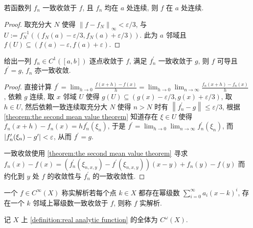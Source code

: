 \begin{lemma}
    若函数列 \(f_n\) 一致收敛于 \(f\), 且 \(f_n\) 均在 \(a\) 处连续, 则 \(f\) 在 \(a\) 处连续.

    \begin{proof}
        取充分大 \(N\) 使得 \(\left\|f - f_N\right\|_\infty < \varepsilon/3\), 与 \(U := f_N^{-1} ((f_N(a) - \varepsilon/3,f_N(a) + \varepsilon/3))\). 
        此为 \(a\) 邻域且 \(f(U) \subseteq (f(a) - \varepsilon, f(a) + \varepsilon)\).
    \end{proof}
\end{lemma}

\begin{lemma}
    给出一列 \(f_n \in C^1([a,b])\) 逐点收敛于 \(f\), 满足 \(f_n^\prime\) 一致收敛于 \(g\),
    则 \(f\) 可导且 \(f^\prime = g\), \(f_n\) 亦一致收敛.

    \begin{proof}
        直接计算 \(f^\prime = \lim_{h \to 0} \frac{f(x+h)-f(x)}{h} = \lim_{h \to 0} \lim_{n \to \infty} \frac{f_n(x+h) - f_n(x)}{h}\),
        依赖 \(g\) 连续, 取 \(x\) 邻域 \(U\) 使得 \(g(U) \subseteq (g(x)-\varepsilon/3,g(x)+\varepsilon/3)\), 取 \(h \in U\), 然后依赖一致连续取充分大 \(N\) 使得 \(n > N\) 时有 \(\left\|f_n^\prime - g\right\| \leq \varepsilon/3\),
        根据 \ref{theorem:the second mean value theorem} 知道存在 \(\xi \in U\) 使得 \(f_n (x+h) - f_n(x) = h f_n^\prime (\xi_n)\), 于是 \(f^\prime = \lim_{h \to 0} \lim_{n \to \infty} f_n^\prime (\xi_n)\),
        而 \(\abs {f^\prime_n (\xi_n) - g^\prime} < \varepsilon\), 从而 \(f^\prime = g\).

        一致收敛使用 \ref{theorem:the second mean value theorem} 寻求 \(f_n(x) - f(x)= (f_n^\prime (\xi_{n,x,y}) - f^\prime (\xi_{n,x,y})) (x - y) + f_n(y) - f(y)\) 而约化到 \(y\) 处 \(f\) 的收敛性与 \(f^\prime_n\) 的一致收敛性.
    \end{proof}
\end{lemma}

\begin{definition}[实解析]
    \label {definition:real analytic function}
    一个 \(f \in C^\infty (X)\) 称实解析若每个点 \(k \in X\) 都存在幂级数 \(\sum_{i=0}^{\infty} a_i (x - k)^i\),
    存在一个 \(k\) 邻域上幂级数一致收敛于 \(f\), 则称 \(f\) 实解析.
\end{definition}

\begin{remark}
    记 \(X\) 上 \ref{definition:real analytic function} 的全体为 \(C^\omega (X)\).
\end{remark}

